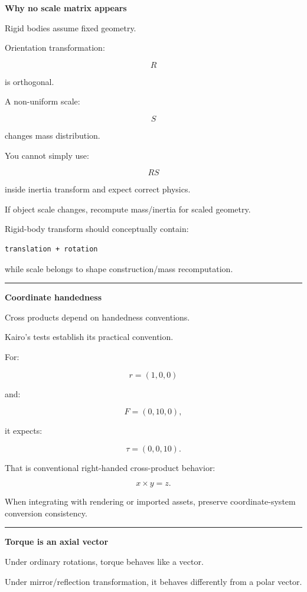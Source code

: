 \textbf{Why no scale matrix appears}

Rigid bodies assume fixed geometry.

Orientation transformation:

\[
R
\]

is orthogonal.

A non-uniform scale:

\[
S
\]

changes mass distribution.

You cannot simply use:

\[
RS
\]

inside inertia transform and expect correct physics.

If object scale changes, recompute mass/inertia for scaled geometry.

Rigid-body transform should conceptually contain:

\begin{verbatim}
translation + rotation
\end{verbatim}

while scale belongs to shape construction/mass recomputation.

\begin{center}\rule{0.5\linewidth}{0.5pt}\end{center}

\textbf{Coordinate handedness}

Cross products depend on handedness conventions.

Kairo's tests establish its practical convention.

For:

\[
r=(1,0,0)
\]

and:

\[
F=(0,10,0),
\]

it expects:

\[
\tau=(0,0,10).
\]

That is conventional right-handed cross-product behavior:

\[
x\times y=z.
\]

When integrating with rendering or imported assets, preserve coordinate-system conversion consistency.

\begin{center}\rule{0.5\linewidth}{0.5pt}\end{center}

\textbf{Torque is an axial vector}

Under ordinary rotations, torque behaves like a vector.

Under mirror/reflection transformation, it behaves differently from a polar vector.


